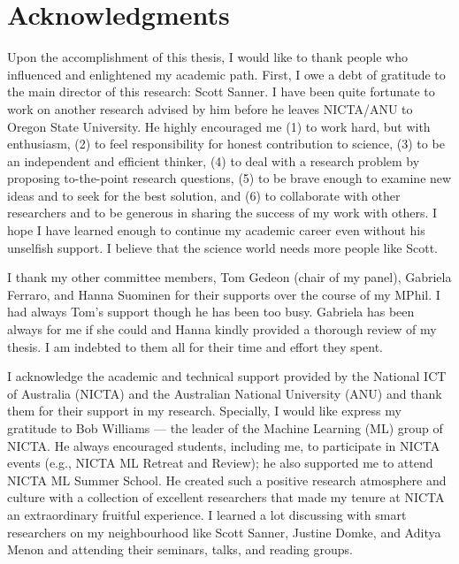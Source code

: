 \chapter*{Acknowledgments}

Upon the accomplishment of this thesis, I would like to thank people who influenced and enlightened my academic path. 
First, I owe a debt of gratitude to the main director of this research: Scott Sanner. I have been quite fortunate to work on another research advised by him before he leaves NICTA/ANU to Oregon State University. He highly encouraged me  (1) to work hard, but with enthusiasm, (2) to feel responsibility for honest contribution to science, (3) to be an independent and efficient thinker, (4) to deal with a research problem by proposing to-the-point research questions, (5) to be brave enough to examine new ideas and to seek for the best solution, and (6) to collaborate with other researchers and to be generous in sharing the success of my work with others. I hope I have learned enough to continue my academic career even without his unselfish support. I believe that the science world needs more people like Scott. 

I thank my other committee members, Tom Gedeon (chair of my panel), Gabriela Ferraro, and Hanna Suominen for their supports over the course of my MPhil. I had always Tom's support though he has been too busy. Gabriela has been always for me if she could and Hanna kindly provided a thorough review of my thesis. 
I am indebted to them all for their time and effort they spent. 

I acknowledge the academic and technical support provided by the
National ICT of Australia (NICTA) and the Australian National University (ANU)
and thank them for their support in my research. Specially, I would like express my gratitude to Bob Williams --- the leader of the Machine Learning (ML) group of NICTA. He always encouraged students, including me, to participate in NICTA events (e.g., NICTA ML Retreat and Review); he also supported me to attend NICTA ML Summer School. He created such a positive research atmosphere and culture with a collection of excellent researchers that made my tenure at NICTA an extraordinary fruitful experience. I learned a lot discussing with smart researchers on my neighbourhood like Scott Sanner, Justine Domke, and Aditya Menon and attending their seminars, talks, and reading groups. 

